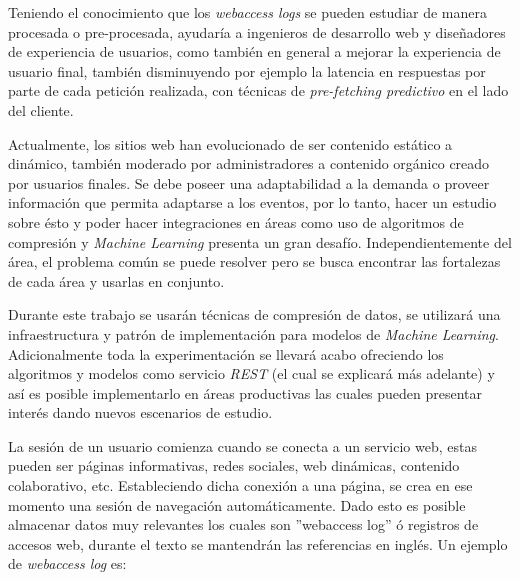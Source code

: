   Teniendo el conocimiento que los \emph{webaccess logs} se pueden estudiar de manera procesada o pre-procesada, ayudaría a ingenieros de desarrollo web y diseñadores de experiencia de usuarios, como también en general a mejorar la experiencia de usuario final, también disminuyendo por ejemplo la latencia en respuestas por parte de cada petición realizada, con técnicas de \emph{pre-fetching predictivo} en el lado del cliente.
  

  Actualmente, los sitios web han evolucionado de ser contenido estático a dinámico, también moderado por administradores a contenido orgánico creado por usuarios finales. Se debe poseer una adaptabilidad a la demanda o proveer información que permita adaptarse a los eventos, por lo tanto, hacer un estudio sobre ésto y poder hacer integraciones en áreas como uso de algoritmos de compresión y \emph{Machine Learning} presenta un gran desafío. Independientemente del área, el problema común  se puede resolver pero se busca encontrar las fortalezas de cada área y usarlas en conjunto. 

  Durante este trabajo se usarán técnicas de compresión de datos, se utilizará una infraestructura y patrón de implementación para modelos de \emph{Machine Learning}. Adicionalmente toda la experimentación se llevará acabo ofreciendo los algoritmos y modelos como servicio \emph{REST} (el cual se explicará más adelante) y así es posible implementarlo en áreas productivas las cuales pueden presentar interés dando nuevos escenarios de estudio.


  La sesión de un usuario comienza cuando se conecta a un servicio web, estas pueden ser páginas informativas, redes sociales, web dinámicas, contenido colaborativo, etc. Estableciendo dicha conexión a una página, se crea en ese momento una sesión de navegación automáticamente. Dado esto es posible almacenar datos muy relevantes los cuales son ''webaccess log'' ó registros de accesos web, durante el texto se mantendrán las referencias en inglés. Un ejemplo de \emph{webaccess log} es:

